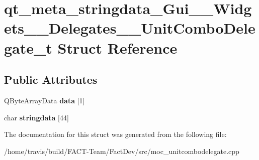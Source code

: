\hypertarget{structqt__meta__stringdata__Gui____Widgets____Delegates____UnitComboDelegate__t}{\section{qt\-\_\-meta\-\_\-stringdata\-\_\-\-Gui\-\_\-\-\_\-\-Widgets\-\_\-\-\_\-\-Delegates\-\_\-\-\_\-\-Unit\-Combo\-Delegate\-\_\-t Struct Reference}
\label{structqt__meta__stringdata__Gui____Widgets____Delegates____UnitComboDelegate__t}
}
\subsection*{Public Attributes}
\begin{DoxyCompactItemize}
\item 
\hypertarget{structqt__meta__stringdata__Gui____Widgets____Delegates____UnitComboDelegate__t_a0ec5d411a4063b7266534ca52c76f6cb}{Q\-Byte\-Array\-Data {\bfseries data} \mbox{[}1\mbox{]}}\label{structqt__meta__stringdata__Gui____Widgets____Delegates____UnitComboDelegate__t_a0ec5d411a4063b7266534ca52c76f6cb}

\item 
\hypertarget{structqt__meta__stringdata__Gui____Widgets____Delegates____UnitComboDelegate__t_aeaf914fa467b4a50aee6bd4b30ae036e}{char {\bfseries stringdata} \mbox{[}44\mbox{]}}\label{structqt__meta__stringdata__Gui____Widgets____Delegates____UnitComboDelegate__t_aeaf914fa467b4a50aee6bd4b30ae036e}

\end{DoxyCompactItemize}


The documentation for this struct was generated from the following file\-:\begin{DoxyCompactItemize}
\item 
/home/travis/build/\-F\-A\-C\-T-\/\-Team/\-Fact\-Dev/src/moc\-\_\-unitcombodelegate.\-cpp\end{DoxyCompactItemize}
